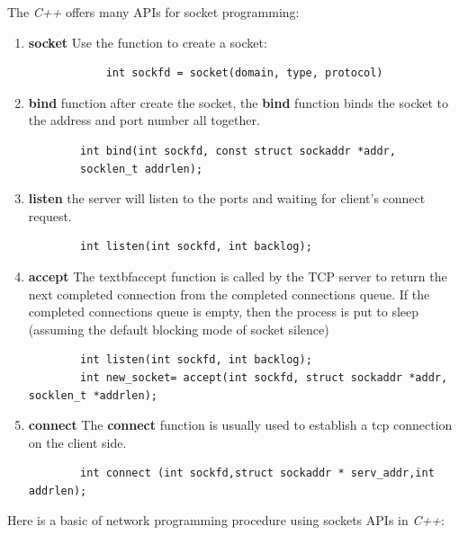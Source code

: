 \documentclass[11pt]{book}
\begin{document}
The \textit{C++} offers many APIs for socket programming:
\begin{enumerate}
	\item \textbf{socket} Use the function  to create a socket:
		\begin{lstlisting}
			int sockfd = socket(domain, type, protocol)
		\end{lstlisting}
		
 	\item \textbf{bind} function after create the socket, the \textbf{bind} function 
	 binds the socket to the address and port number all together.
	 \begin{lstlisting}
		int bind(int sockfd, const struct sockaddr *addr, 
		socklen_t addrlen);
	 \end{lstlisting}
	 \item \textbf{listen} the server will listen to the ports and waiting for client's connect request.
	 \begin{lstlisting}
		int listen(int sockfd, int backlog);
	 \end{lstlisting}
	 \item \textbf{accept} The textbf{accept} function is called by the TCP server to return the next completed connection from the completed connections queue. If the completed connections queue is empty, then the process is put to sleep (assuming the default blocking mode of socket silence)
	 \begin{lstlisting}
		int listen(int sockfd, int backlog);
		int new_socket= accept(int sockfd, struct sockaddr *addr, socklen_t *addrlen);
	 \end{lstlisting}
	 \item \textbf{connect} The \textbf{connect} function is usually used to establish a tcp connection on the client side.
	 \begin{lstlisting}
		int connect (int sockfd,struct sockaddr * serv_addr,int addrlen);
	 \end{lstlisting}
\end{enumerate}
Here is a basic of network programming procedure using sockets APIs in \textit{C++}:
\end{document}
